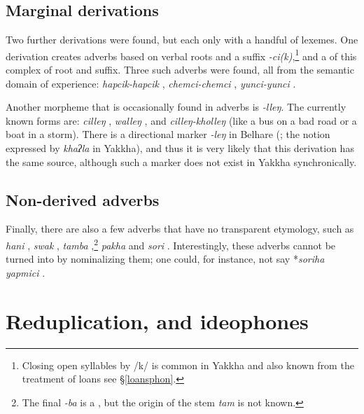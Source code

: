 \subsection{Marginal derivations}

Two further derivations were found, but each only with a handful of lexemes. One derivation creates adverbs based on verbal roots and a suffix \emph{-ci(k)},\footnote{Closing open syllables by /k/ is common in Yakkha and also known from the treatment of  loans see §\ref{loansphon}.} and a  of this complex of root and suffix. Three such adverbs were found, all from the semantic domain of experience:   \emph{hapcik-hapcik} , \emph{chemci-chemci} , \emph{yunci-yunci} .

Another morpheme that is occasionally found  in adverbs is \emph{-lleŋ}. The currently known forms are: \emph{cilleŋ} , \emph{walleŋ} , and \emph{cilleŋ-kholleŋ}  (like a bus on a bad road or a boat in a storm).
There is a  directional  marker \emph{-leŋ} in Belhare (\citealt{Bickel2003Belhare}; the notion expressed by \emph{khaʔla} in Yakkha), and thus it is very likely that this derivation has the same source, although such a marker does not exist in Yakkha synchronically.

\subsection{Non-derived adverbs}

Finally, there are also a few adverbs that have no transparent etymology, such as \emph{hani} , \emph{swak} , \emph{tamba} ,\footnote{The final  \emph{-ba} is a , but the origin of the stem \emph{tam} is not known.} \emph{pakha}  and \emph{sori} . Interestingly, these adverbs cannot be turned into  by nominalizing them; one could, for instance, not say *\emph{soriha yapmici} .

\section{Reduplication,  and ideophones}\label{redup}


